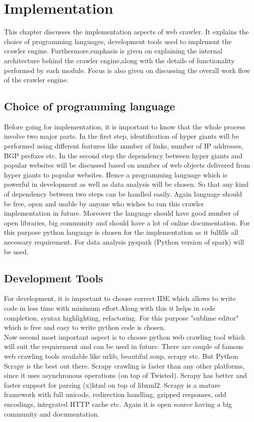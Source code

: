 \section{Implementation\label{cha:chapter4}}
\noindent This chapter discusses the implementation aspects of web crawler. It explains the
choice of programming languages, development tools used to implement the crawler engine. Furthermore,emphasis is given on explaining the internal architecture behind the crawler engine,along with the details of functionality performed by each module. Focus is also given on discussing the overall work flow of the crawler engine.\\ 
\subsection{Choice of programming language}
\noindent Before going for implementation, it is important to know that the whole process involve two major parts. In the first step, identification of hyper giants will be performed using different features like number of links, number of IP addresses, BGP prefixes etc. In the second step the dependency between hyper giants and popular websites will be discussed based on number of web objects delivered from hyper giants to popular websites. Hence a programming language which is powerful in development as well as data analysis will be chosen. So that any kind of dependency between two steps can be handled easily. Again language should be free, open and usable by anyone who wishes to run this crawler implementation in future. Moreover the language should have good number of open libraries, big community and should have a lot of online documentation. For this purpose python language is chosen for the implementation as it fulfills all necessary requirement. For data analysis pyspark (Python version of spark) will be used.\\

\subsection{Development Tools}
\noindent For development, it is important to choose correct IDE which allows to write code in less time with minimum effort.Along with this it helps in code completion, syntax highlighting, refactoring. For this purpose "sublime editor" which is free and easy to write python code is chosen.\\

\noindent Now second most important aspect is to choose python web crawling tool which will suit the requirement and can be used in future. There are couple of famous web crawling tools available like urlib, beautiful soup, scrapy etc. But Python Scrapy is the best out there. Scrapy crawling is faster than any other platforms, since it uses asynchronous operations (on top of Twisted). Scrapy has better and faster support for parsing (x)html on top of libxml2. Scrapy is a mature framework with full unicode, redirection handling, gzipped responses, odd encodings, integrated HTTP cache etc. Again it is open source having a big community and documentation.\\


